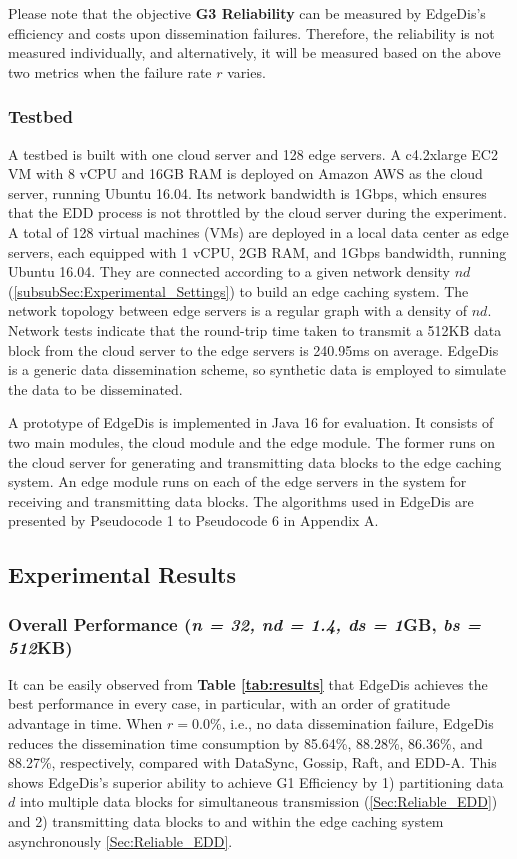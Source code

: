 \documentclass[10pt,journal,compsoc]{IEEEtran}
\begin{document}
Please note that the objective \textbf{G3 Reliability} can be measured by EdgeDis's efficiency and costs upon dissemination failures. Therefore, the reliability is not measured individually, and alternatively, it will be measured based on the above two metrics when the failure rate $r$ varies.

\subsubsection{Testbed}
\label{subsubSec:testbed}
A testbed is built with one cloud server and 128 edge servers. A c4.2xlarge EC2 VM with 8 vCPU and 16GB RAM is deployed on Amazon AWS as the cloud server, running Ubuntu 16.04. Its network bandwidth is 1Gbps, which ensures that the EDD process is not throttled by the cloud server during the experiment. A total of 128 virtual machines (VMs) are deployed in a local data center as edge servers, each equipped with 1 vCPU, 2GB RAM, and 1Gbps bandwidth, running Ubuntu 16.04. They are connected according to a given network density $nd$ (\cref{subsubSec:Experimental_Settings}) to build an edge caching system. The network topology between edge servers is a regular graph with a density of $nd$. Network tests indicate that the round-trip time taken to transmit a 512KB data block from the cloud server to the edge servers is 240.95ms on average.  EdgeDis is a generic data dissemination scheme, so synthetic data is employed to simulate the data to be disseminated.

A prototype of EdgeDis is implemented in Java 16 for evaluation. It consists of two main modules, the cloud module and the edge module. The former runs on the cloud server for generating and transmitting data blocks to the edge caching system. An edge module runs on each of the edge servers in the system for receiving and transmitting data blocks. The algorithms used in EdgeDis are presented by Pseudocode 1 to Pseudocode 6 in Appendix A.

\subsection{Experimental Results}
\label{subSec:Experimets_ExperimentResults}

\subsubsection{Overall Performance (\textit{n = 32, nd = 1.4, ds = 1}GB, \textit{bs = 512}KB)}
It can be easily observed from \textbf{Table \ref{tab:results}} that EdgeDis achieves the best performance in every case, in particular, with an order of gratitude advantage in time. When $r=0.0\%$, i.e., no data dissemination failure, EdgeDis reduces the dissemination time consumption by 85.64\%, 88.28\%, 86.36\%, and 88.27\%,  respectively, compared with DataSync, Gossip, Raft, and EDD-A. This shows EdgeDis's superior ability to achieve G1 Efficiency by 1) partitioning data $d$ into multiple data blocks for simultaneous transmission (\cref{Sec:Reliable_EDD}) and 2) transmitting data blocks to and within the edge caching system asynchronously \cref{Sec:Reliable_EDD}.
\end{document}
